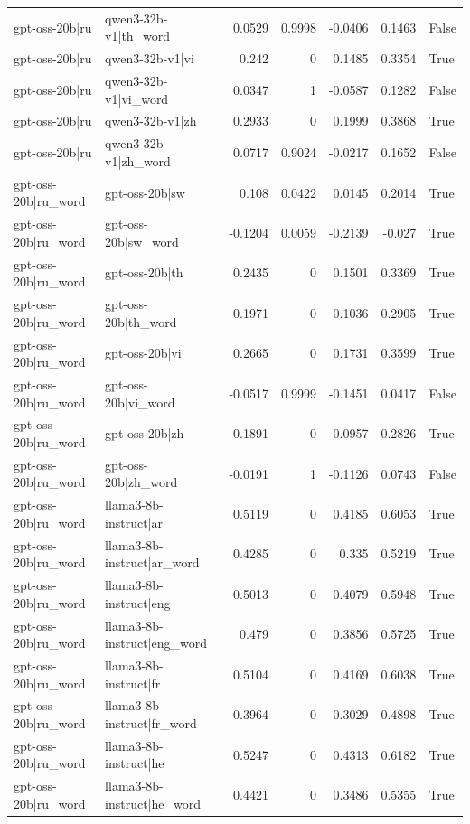 \begin{table}
\begin{tabular}{l l r r r r l}
gpt-oss-20b|ru & qwen3-32b-v1|th_word & 0.0529 & 0.9998 & -0.0406 & 0.1463 & False \\
gpt-oss-20b|ru & qwen3-32b-v1|vi & 0.242 & 0 & 0.1485 & 0.3354 & True \\
gpt-oss-20b|ru & qwen3-32b-v1|vi_word & 0.0347 & 1 & -0.0587 & 0.1282 & False \\
gpt-oss-20b|ru & qwen3-32b-v1|zh & 0.2933 & 0 & 0.1999 & 0.3868 & True \\
gpt-oss-20b|ru & qwen3-32b-v1|zh_word & 0.0717 & 0.9024 & -0.0217 & 0.1652 & False \\
gpt-oss-20b|ru_word & gpt-oss-20b|sw & 0.108 & 0.0422 & 0.0145 & 0.2014 & True \\
gpt-oss-20b|ru_word & gpt-oss-20b|sw_word & -0.1204 & 0.0059 & -0.2139 & -0.027 & True \\
gpt-oss-20b|ru_word & gpt-oss-20b|th & 0.2435 & 0 & 0.1501 & 0.3369 & True \\
gpt-oss-20b|ru_word & gpt-oss-20b|th_word & 0.1971 & 0 & 0.1036 & 0.2905 & True \\
gpt-oss-20b|ru_word & gpt-oss-20b|vi & 0.2665 & 0 & 0.1731 & 0.3599 & True \\
gpt-oss-20b|ru_word & gpt-oss-20b|vi_word & -0.0517 & 0.9999 & -0.1451 & 0.0417 & False \\
gpt-oss-20b|ru_word & gpt-oss-20b|zh & 0.1891 & 0 & 0.0957 & 0.2826 & True \\
gpt-oss-20b|ru_word & gpt-oss-20b|zh_word & -0.0191 & 1 & -0.1126 & 0.0743 & False \\
gpt-oss-20b|ru_word & llama3-8b-instruct|ar & 0.5119 & 0 & 0.4185 & 0.6053 & True \\
gpt-oss-20b|ru_word & llama3-8b-instruct|ar_word & 0.4285 & 0 & 0.335 & 0.5219 & True \\
gpt-oss-20b|ru_word & llama3-8b-instruct|eng & 0.5013 & 0 & 0.4079 & 0.5948 & True \\
gpt-oss-20b|ru_word & llama3-8b-instruct|eng_word & 0.479 & 0 & 0.3856 & 0.5725 & True \\
gpt-oss-20b|ru_word & llama3-8b-instruct|fr & 0.5104 & 0 & 0.4169 & 0.6038 & True \\
gpt-oss-20b|ru_word & llama3-8b-instruct|fr_word & 0.3964 & 0 & 0.3029 & 0.4898 & True \\
gpt-oss-20b|ru_word & llama3-8b-instruct|he & 0.5247 & 0 & 0.4313 & 0.6182 & True \\
gpt-oss-20b|ru_word & llama3-8b-instruct|he_word & 0.4421 & 0 & 0.3486 & 0.5355 & True \\

\end{tabular}
\end{table}
